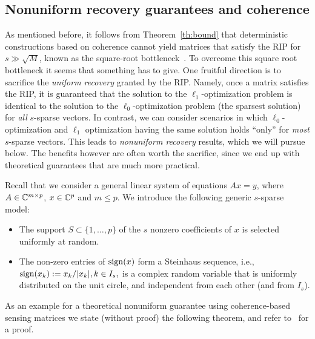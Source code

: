 \subsection{Nonuniform recovery guarantees and coherence} \label{s:cs_practice0}


As mentioned before, it follows from Theorem~\ref{th:bound} that deterministic constructions based on coherence cannot yield matrices that satisfy the RIP for $s\gg \sqrt{M}$, known as the square-root bottleneck~\cite{Bandeira_RoadRIP,Tao_blog_deterministicRIP}.
To overcome this square root bottleneck it seems that something has to give. One fruitful direction is to sacrifice the {\em uniform recovery} granted by the RIP. Namely, once a matrix satisfies the RIP, it is guaranteed that the solution to the $\ell_1$-optimization problem is identical to the solution to the $\ell_0$-optimization problem (the sparsest solution) for {\em all} $s$-sparse vectors. In contrast, we can consider scenarios in which   $\ell_0$-optimization and $\ell_1$ optimization having the same solution holds ``only'' for {\em most} $s$-sparse vectors. This leads to {\em nonuniform recovery} results, which we will pursue below. The benefits however are often worth the sacrifice, since we end up with theoretical guarantees that are much more practical.

Recall that we consider a general linear system of equations $A x = y$, where $A \in \mathbb{C}^{m \times p}$, $x \in \mathbb{C}^p$
and $m \le p$. We introduce the following generic $s$-sparse model:
\begin{itemize}
\setlength{\parsep}{-0.3ex}
\item[(i)] The support $S \subset \{1,\dots,p\}$ of the $s$ nonzero
coefficients of $x$ is selected uniformly at random.
\item[(ii)] The non-zero entries of $\operatorname{sign}(x)$ form a Steinhaus sequence, i.e.,
$\operatorname{sign}(x_k):=x_k/|x_k|, k\in I_s,$ is a complex random variable that is
uniformly distributed on the unit circle, and independent from each other (and from $I_s$).
\end{itemize}


As an example for a theoretical nonuniform  guarantee using coherence-based sensing matrices  we state (without proof) the following theorem, and refer to~\cite{FoucartRauhut_CSbook} for a proof.


